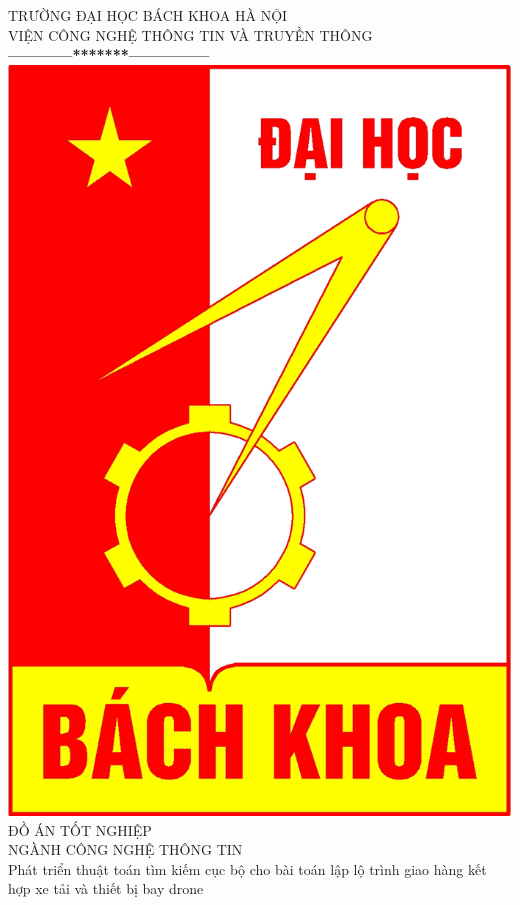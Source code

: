 \documentclass[a4paper,12pt]{report}
\begin{document}
\thispagestyle{empty}
\thisfancypage{
\setlength{\fboxrule}{1pt}
\doublebox}{}

\begin{center}
{\fontsize{16}{19}\selectfont TRƯỜNG ĐẠI HỌC BÁCH KHOA HÀ NỘI\\
VIỆN CÔNG NGHỆ THÔNG TIN VÀ TRUYỀN THÔNG}\\
\textbf{------------*******---------------}\\[1cm]
\includegraphics[scale=0.13]{hust.jpg}\\[1.3cm]
{\fontsize{23}{43}\selectfont ĐỒ ÁN TỐT NGHIỆP}\\[0.1cm]
{\fontsize{25}{10}\selectfont NGÀNH CÔNG NGHỆ THÔNG TIN}\\[0.9cm]
{\fontsize{20}{24}\selectfont Phát triển thuật toán tìm kiếm cục bộ cho bài toán lập lộ trình giao hàng kết hợp xe tải và thiết bị bay drone}\\[2.5cm]


\end{center}
\end{document}
